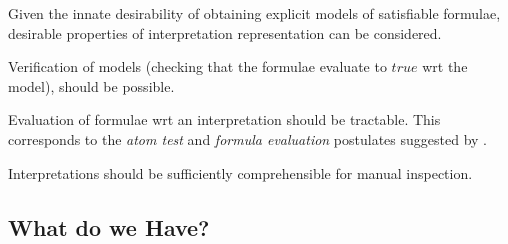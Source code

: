 \documentclass{easychair}
\newenvironment{packed_itemize}{
\vspace*{-0.3em}
\begin{itemize}
\setlength{\partopsep}{0pt}
\setlength{\itemsep}{1pt}
\setlength{\parskip}{0pt}
\setlength{\parsep}{0pt}
}{\end{itemize}}
\begin{document}
Given the innate desirability of obtaining explicit models of satisfiable formulae, desirable
properties of interpretation representation can be considered.
\begin{packed_itemize}
\item Verification of models (checking that the formulae evaluate to $true$ wrt the model), 
      should be possible.
\item Evaluation of formulae wrt an interpretation should be tractable.
      This corresponds to the {\em atom test} and {\em formula evaluation} postulates suggested
      by \cite{FL96,CLP04}.
\item Interpretations should be sufficiently comprehensible for manual inspection.
\end{packed_itemize}

\subsection{What do we Have?}
\label{Have}
\end{document}
